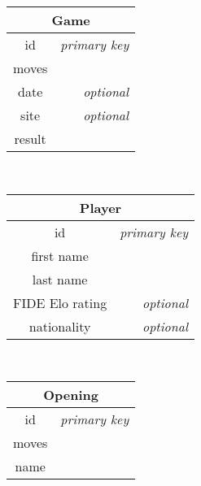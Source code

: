 \documentclass{article}
\begin{document}
\begin{table}[ht!]
    \begin{subtable}{3.5cm}
	\begin{tabular}[t]{|cr|}
	\hline
	\multicolumn{2}{|c|}{\textbf{Game}} \\
	\hline 
	id     & \em{primary key} \\
	moves  &                  \\
	date   & \em{optional}    \\
	site   & \em{optional}    \\
	result &                  \\
	\hline
	\end{tabular}
    \end{subtable}
    ~
    \begin{subtable}{5cm}
	\begin{tabular}[t]{|cr|}
	\hline
	\multicolumn{2}{|c|}{\textbf{Player}} \\
	\hline 
	id              & \em{primary key} \\
	first name      &                  \\
	last name       &                  \\
	FIDE Elo rating & \em{optional}    \\
	nationality     & \em{optional}    \\
	\hline
	\end{tabular}
    \end{subtable}
    ~
    \begin{subtable}{3cm}
	\begin{tabular}[t]{|cr|}
	\hline
	\multicolumn{2}{|c|}{\textbf{Opening}} \\
	\hline 
	id     & \em{primary key} \\
	moves  &                  \\
	name   &                  \\
	\hline
	\end{tabular}
    \end{subtable}
\end{table}
    
\end{document}
